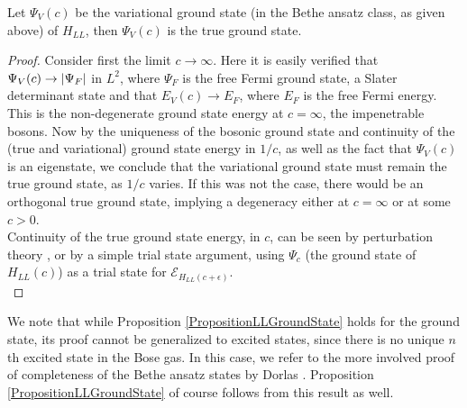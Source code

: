 	\begin{proposition}\label{PropositionLLGroundState}
		Let $ \Psi_V(c) $ be the variational ground state (in the Bethe ansatz class, as given above) of $ H_{LL} $, then $ \Psi_V(c) $ is the true ground state.
	\end{proposition} 
\begin{proof}[Proof]
	Consider first the limit $ c\to \infty $. Here it is easily verified that $\Psi_V(c)\to \left\lvert \Psi_F \right\rvert$ in $ L^2 $, where $ \Psi_F $ is the free Fermi ground state, \ie a Slater determinant state and that $ E_V(c)\to E_F $, where $ E_F $ is the free Fermi energy. This is the non-degenerate ground state energy at $ c=\infty $, \ie the impenetrable bosons. Now by the uniqueness of the bosonic ground state and continuity of the (true and variational) ground state energy in $ 1/c $, as well as the fact that $ \Psi_V(c) $ is an eigenstate, we conclude that the variational ground state must remain the true ground state, as $ 1/c $ varies. If this was not the case, there would be an orthogonal true ground state, implying a degeneracy either at $ c=\infty $ or at some $ c>0 $. \\
	Continuity of the true ground state energy, in $ c $, can be seen by perturbation theory \cite{reed1978iv}, or by a simple trial state argument, using $ \Psi_c $ (the ground state of $ H_{LL}(c) $) as a trial state for $ \mathcal{E}_{H_{LL}(c+\epsilon)} $.\\
\end{proof}
We note that while Proposition \ref{PropositionLLGroundState} holds for the ground state, its proof cannot be generalized to excited states, since there is no unique $ n $th excited state in the Bose gas. In this case, we refer to the more involved proof of completeness of the Bethe ansatz states by Dorlas \cite{cmp/1104252974}. Proposition \ref{PropositionLLGroundState} of course follows from this result as well.\\
